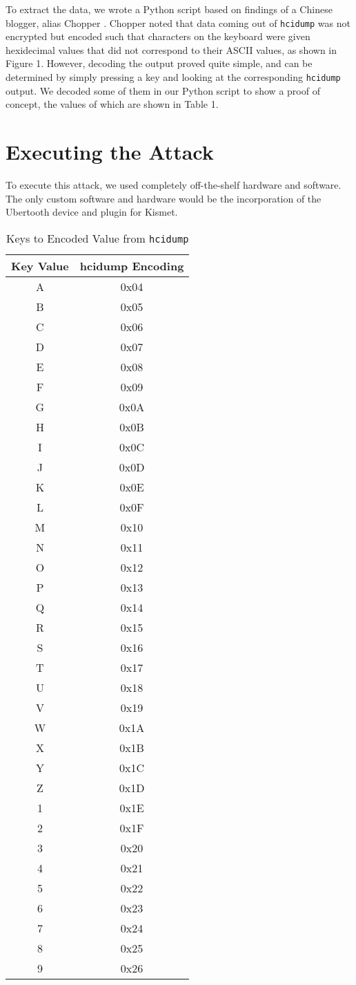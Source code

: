 \documentclass{acm_proc_article-sp}
\begin{document}
To extract the data, we wrote a Python script based on findings of a Chinese blogger, alias Chopper \cite{chopper}. Chopper noted that data coming out of \texttt{hcidump} was not encrypted but encoded such that characters on the keyboard were given hexidecimal values that did not correspond to their ASCII values, as shown in Figure 1. However, decoding the output proved quite simple, and can be determined by simply pressing a key and looking at the corresponding \texttt{hcidump} output. We decoded some of them in our Python script to show a proof of concept, the values of which are shown in Table 1.

\section{Executing the Attack}
To execute this attack, we used completely off-the-shelf hardware and software. The only custom software and hardware would be the incorporation of the Ubertooth device and plugin for Kismet. 
\begin{table}
\begin{tabular}{|c|c|}
\hline
Key Value & hcidump Encoding\\\hline
A&0x04\\
B&0x05\\
C&0x06\\ 
D&0x07\\
E&0x08\\
F&0x09\\
G&0x0A\\
H&0x0B\\
I&0x0C\\
J&0x0D\\
K&0x0E\\
L&0x0F\\
M&0x10\\
N&0x11\\
O&0x12\\
P&0x13\\
Q&0x14\\
R&0x15\\
S&0x16\\
T&0x17\\
U&0x18\\
V&0x19\\
W&0x1A\\
X&0x1B\\
Y&0x1C\\
Z&0x1D\\
1&0x1E\\
2&0x1F\\
3&0x20\\
4&0x21\\
5&0x22\\
6&0x23\\
7&0x24\\
8&0x25\\
9&0x26\\\hline
\end{tabular}
\begin{center}
\caption{Keys to Encoded Value from \texttt{hcidump}}
\end{center}
\label{table1}
\end{table}
\end{document}
